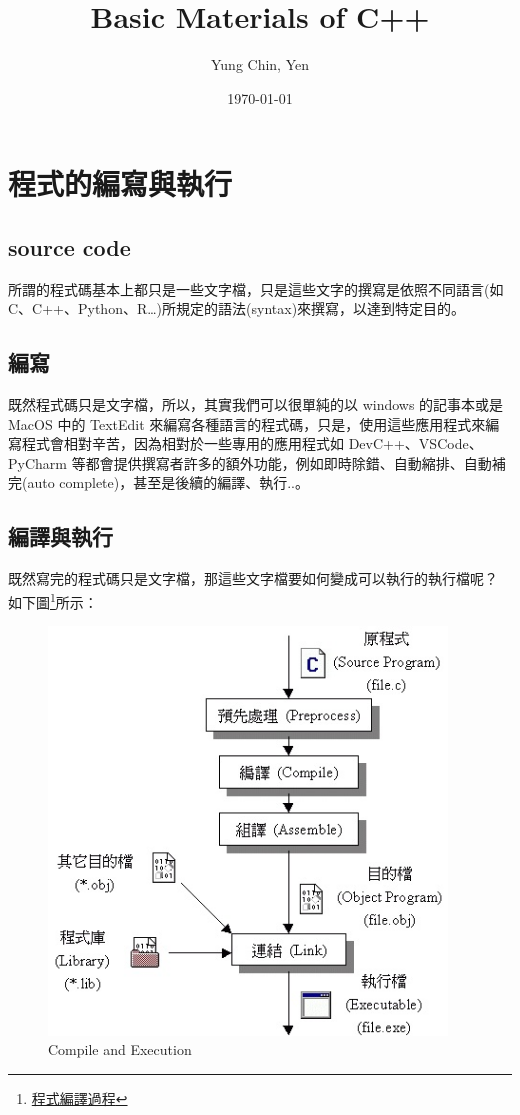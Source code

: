 \documentclass[12pt,a4paper]{article}
\author{Yung Chin, Yen}
\date{\today}
\title{Basic Materials of C++}
\begin{document}
\maketitle
\tableofcontents

\newpage

\section{程式的編寫與執行}
\label{cpp_execution}
\subsection{source code}
\label{sec:org1eedfc2}
所謂的程式碼基本上都只是一些文字檔，只是這些文字的撰寫是依照不同語言(如 C、C++、Python、R\ldots{})所規定的語法(syntax)來撰寫，以達到特定目的。

\subsection{編寫}
\label{sec:org216aff5}
既然程式碼只是文字檔，所以，其實我們可以很單純的以 windows 的記事本或是 MacOS 中的 TextEdit 來編寫各種語言的程式碼，只是，使用這些應用程式來編寫程式會相對辛苦，因為相對於一些專用的應用程式如 DevC++、VSCode、PyCharm 等都會提供撰寫者許多的額外功能，例如即時除錯、自動縮排、自動補完(auto complete)，甚至是後續的編譯、執行..。

\subsection{編譯與執行}
\label{sec:org90bdd14}
既然寫完的程式碼只是文字檔，那這些文字檔要如何變成可以執行的執行檔呢？
如下圖\footnote{\href{http://www2.lssh.tp.edu.tw/\~hlf/class-1/lang-c/compile.htm}{程式編譯過程}}所示：

\begin{figure}[htbp]
\centering
\includegraphics[width=400]{images/c_compile.jpg}
\caption{\label{fig:CNE}Compile and Execution}
\end{figure}
\end{document}
